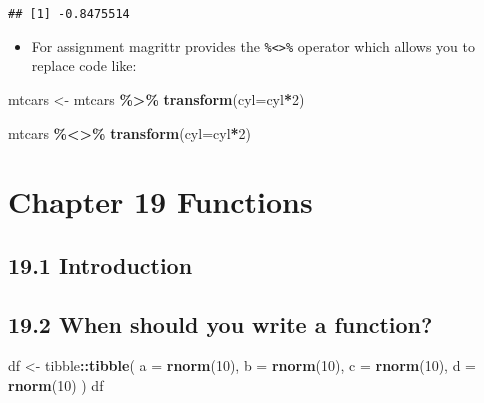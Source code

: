 \documentclass[
]{article}
\newenvironment{Shaded}{\begin{snugshade}}{\end{snugshade}}
\newcommand{\AttributeTok}[1]{\textcolor[rgb]{0.13,0.29,0.53}{#1}}
\newcommand{\DecValTok}[1]{\textcolor[rgb]{0.00,0.00,0.81}{#1}}
\newcommand{\FunctionTok}[1]{\textcolor[rgb]{0.13,0.29,0.53}{\textbf{#1}}}
\newcommand{\NormalTok}[1]{#1}
\newcommand{\OtherTok}[1]{\textcolor[rgb]{0.56,0.35,0.01}{#1}}
\newcommand{\SpecialCharTok}[1]{\textcolor[rgb]{0.81,0.36,0.00}{\textbf{#1}}}
\providecommand{\tightlist}{%
  \setlength{\itemsep}{0pt}\setlength{\parskip}{0pt}}
\begin{document}
\begin{verbatim}
## [1] -0.8475514
\end{verbatim}

\begin{itemize}
\tightlist
\item
  For assignment magrittr provides the
  \texttt{\%\textless{}\textgreater{}\%} operator which allows you to
  replace code like:
\end{itemize}

\begin{Shaded}
\begin{Highlighting}[]
\NormalTok{mtcars }\OtherTok{\textless{}{-}}\NormalTok{ mtcars }\SpecialCharTok{\%\textgreater{}\%} 
  \FunctionTok{transform}\NormalTok{(}\AttributeTok{cyl=}\NormalTok{cyl}\SpecialCharTok{*}\DecValTok{2}\NormalTok{)}
\end{Highlighting}
\end{Shaded}

\begin{Shaded}
\begin{Highlighting}[]
\NormalTok{mtcars }\SpecialCharTok{\%\textless{}\textgreater{}\%} \FunctionTok{transform}\NormalTok{(}\AttributeTok{cyl=}\NormalTok{cyl}\SpecialCharTok{*}\DecValTok{2}\NormalTok{)}
\end{Highlighting}
\end{Shaded}

\hypertarget{chapter-19-functions}{%
\section{Chapter 19 Functions}\label{chapter-19-functions}}

\hypertarget{introduction}{%
\subsection{19.1 Introduction}\label{introduction}}

\hypertarget{when-should-you-write-a-function}{%
\subsection{19.2 When should you write a
function?}\label{when-should-you-write-a-function}}

\begin{Shaded}
\begin{Highlighting}[]
\NormalTok{df }\OtherTok{\textless{}{-}}\NormalTok{ tibble}\SpecialCharTok{::}\FunctionTok{tibble}\NormalTok{(}
  \AttributeTok{a =} \FunctionTok{rnorm}\NormalTok{(}\DecValTok{10}\NormalTok{),}
  \AttributeTok{b =} \FunctionTok{rnorm}\NormalTok{(}\DecValTok{10}\NormalTok{),}
  \AttributeTok{c =} \FunctionTok{rnorm}\NormalTok{(}\DecValTok{10}\NormalTok{),}
  \AttributeTok{d =} \FunctionTok{rnorm}\NormalTok{(}\DecValTok{10}\NormalTok{)}
\NormalTok{)}
\NormalTok{df}
\end{Highlighting}
\end{Shaded}
\end{document}
